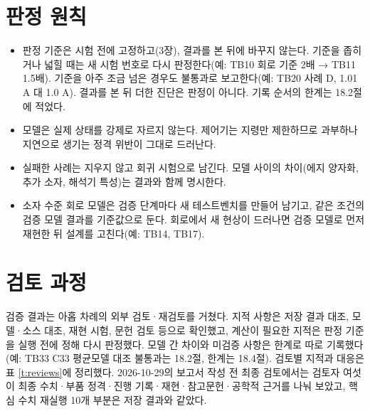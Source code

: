 \section{판정 원칙}

\begin{itemize}
\item 판정 기준은 시험 전에 고정하고(3장), 결과를 본 뒤에 바꾸지 않는다. 기준을 좁히거나 넓힐 때는 새 시험 번호로 다시 판정한다(예: TB10 회로 기준 2배 → TB11 1.5배). 기준을 아주 조금 넘은 경우도 불통과로 보고한다(예: TB20 사례 D, 1.01 A 대 1.0 A). 결과를 본 뒤 더한 진단은 판정이 아니다. 기록 순서의 한계는 18.2절에 적었다.
\item 모델은 실제 상태를 강제로 자르지 않는다. 제어기는 지령만 제한하므로 과부하나 지연으로 생기는 정격 위반이 그대로 드러난다.
\item 실패한 사례는 지우지 않고 회귀 시험으로 남긴다. 모델 사이의 차이(에지 양자화, 추가 소자, 해석기 특성)는 결과와 함께 명시한다.
\item 소자 수준 회로 모델은 검증 단계마다 새 테스트벤치를 만들어 남기고, 같은 조건의 검증 모델 결과를 기준값으로 둔다. 회로에서 새 현상이 드러나면 검증 모델로 먼저 재현한 뒤 설계를 고친다(예: TB14, TB17).
\end{itemize}

\section{검토 과정}

검증 결과는 아홉 차례의 외부 검토·재검토를 거쳤다. 지적 사항은 저장 결과 대조, 모델·소스 대조, 재현 시험, 문헌 검토 등으로 확인했고, 계산이 필요한 지적은 판정 기준을 실행 전에 정해 다시 판정했다. 모델 간 차이와 미검증 사항은 한계로 따로 기록했다(예: TB33 C33 평균모델 대조 불통과는 18.2절, 한계는 18.4절). 검토별 지적과 대응은 표 \ref{t:reviews}에 정리했다. 2026-10-29의 보고서 작성 전 최종 검토에서는 검토자 여섯이 최종 수치·부품 정격·진행 기록·재현·참고문헌·공학적 근거를 나눠 보았고, 핵심 수치 재실행 10개 부분은 저장 결과와 같았다.
